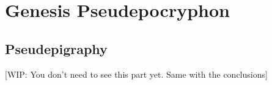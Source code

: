 
\chapter{Genesis Pseudepocryphon}




\section{Pseudepigraphy}

[WIP: You don't need to see this part yet. Same with the conclusions]

% 
